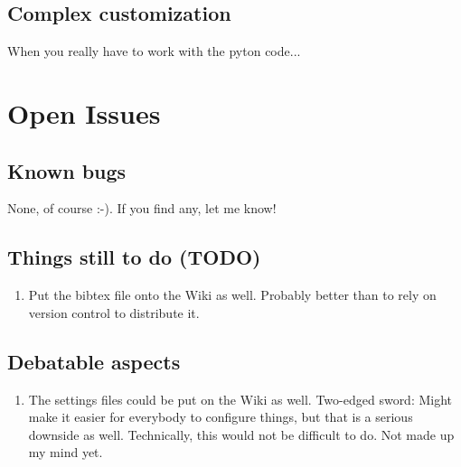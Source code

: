 \documentclass[a4paper,10pt,english]{sphinxmanual}
\begin{document}
\section{Complex customization}
\label{customize:complex-customization}
When you really have to work with the pyton code...


\chapter{Open Issues}
\label{openissues::doc}\label{openissues:open-issues}

\section{Known bugs}
\label{openissues:known-bugs}
None, of course :-). If you find any, let me know!


\section{Things still to do (TODO)}
\label{openissues:things-still-to-do-todo}\begin{enumerate}
\item {} 
Put the bibtex file onto the Wiki as
well. Probably better than to rely on version
control to distribute it.

\end{enumerate}


\section{Debatable aspects}
\label{openissues:debatable-aspects}\begin{enumerate}
\item {} 
The settings files could be put on the Wiki as
well. Two-edged sword: Might make it easier for
everybody to configure things, but that is a
serious downside as well. Technically, this would
not be difficult to do. Not made up my mind yet.

\end{enumerate}
\end{document}
